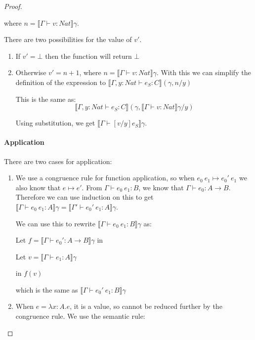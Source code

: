 \begin{proof}
\begin{enumerate}
{where $n = \llbracket \Gamma \vdash v : Nat \rrbracket \gamma$.

There are two possibilities for the value of $v'$.
\begin{enumerate}
\item{If $v' = \bot$ then the function will return $\bot$}
\item{Otherwise $v' = n+1$, where $n = \llbracket \Gamma \vdash v : Nat \rrbracket \gamma$. With this we can simplify the definition of the expression to $\llbracket \Gamma, y : Nat \vdash e_S : C \rrbracket (\gamma, n/y)$

This is the same as:
\[\llbracket \Gamma, y : Nat \vdash e_S : C \rrbracket (\gamma, \llbracket \Gamma \vdash v : Nat \rrbracket \gamma /y)\]

Using substitution, we get $\llbracket \Gamma \vdash [v/y]e_S \rrbracket \gamma$.}
\end{enumerate}
}
\end{enumerate}

\paragraph{Application}There are two cases for application:

\begin{enumerate}
\item{We use a congruence rule for function application, so when $e_0 \ e_1 \mapsto e_0' \ e_1$ we also know that $e \mapsto e'$. From $\Gamma \vdash e_0 \ e_1 : B$, we know that $\Gamma \vdash e_0 : A \to B$. Therefore we can use induction on this to get $\llbracket \Gamma \vdash e_0 \ e_1 : A \rrbracket \gamma =  \llbracket \Gamma' \vdash e_0' \ e_1 : A \rrbracket \gamma$.

We can use this to rewrite $\llbracket \Gamma \vdash e_0 \ e_1 : B \rrbracket \gamma$ as:

Let $f = \llbracket \Gamma \vdash e_0' : A \to B \rrbracket\gamma$ in 

\hspace{4.5cm} Let $v = \llbracket \Gamma \vdash e_1 : A \rrbracket\gamma$ 

\hspace{7cm} in $f(v)$

which is the same as $\llbracket \Gamma \vdash e_0' \ e_1 : B \rrbracket \gamma$
}
\item{When $e = \lambda x:A.e$, it is a value, so cannot be reduced further by the congruence rule. We use the semantic rule:

}
\end{enumerate}
\end{proof}
